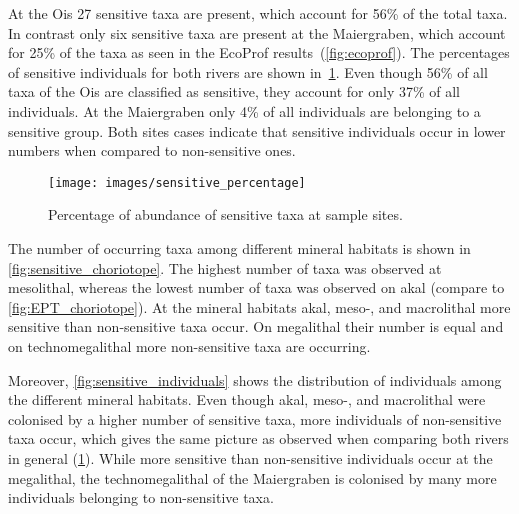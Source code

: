 At the Ois 27 sensitive taxa are present, which account for 56\% of the total taxa. In contrast only six sensitive taxa are present at the Maiergraben, which account for 25\% of the taxa as seen in the EcoProf results~(\cref{fig:ecoprof}). The percentages of sensitive individuals for both rivers are shown in~\cref{fig:sensitive_percentage}. Even though 56\% of all taxa of the Ois are classified as sensitive, they account for only 37\% of all individuals. At the Maiergraben only 4\% of all individuals are belonging to a sensitive group. Both sites cases indicate that sensitive individuals occur in lower numbers when compared to non-sensitive ones.


\begin{figure}[!htb]                            %
  \center
  \texttt{[image: images/sensitive\_percentage]}                 %
  \caption{Percentage of abundance of sensitive taxa at sample sites.}                      %
  \label{fig:sensitive_percentage}                                                        %
\end{figure}


The number of occurring taxa among different mineral habitats is shown in \cref{fig:sensitive_choriotope}. The highest number of taxa was observed at mesolithal, whereas the lowest number of taxa was observed on akal (compare to \cref{fig:EPT_choriotope}). At the mineral habitats akal, meso-, and macrolithal more sensitive than non-sensitive taxa occur. On megalithal their number is equal and on technomegalithal more non-sensitive taxa are occurring.



Moreover, \cref{fig:sensitive_individuals} shows the distribution of individuals among the different mineral habitats. Even though akal, meso-, and macrolithal were colonised by a higher number of sensitive taxa, more individuals of non-sensitive taxa occur, which gives the same picture as observed when comparing both rivers in general (\cref{fig:sensitive_percentage}). While more sensitive than non-sensitive individuals occur at the megalithal, the technomegalithal of the Maiergraben is colonised by many more individuals belonging to non-sensitive taxa.

